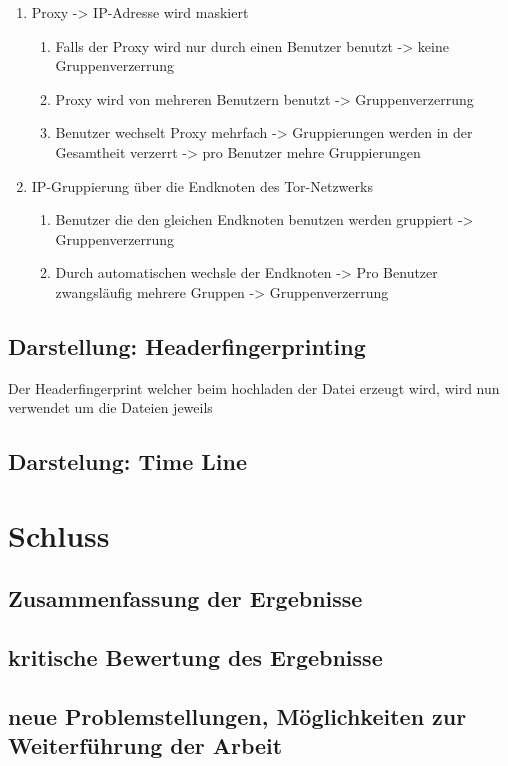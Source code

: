 \documentclass[
    fontsize=12pt,
    headings=small,
    parskip=half,           %
    bibliography=totoc,
    numbers=noenddot,       %
    open=any,               %
    ]{scrreprt}
\begin{document}
\begin{enumerate}
\item Proxy -> IP-Adresse wird maskiert
\begin{enumerate}
\item Falls der Proxy wird nur durch einen Benutzer benutzt -> keine Gruppenverzerrung 
\item Proxy wird von mehreren Benutzern benutzt -> Gruppenverzerrung 
\item Benutzer wechselt Proxy mehrfach -> Gruppierungen werden in der Gesamtheit verzerrt -> pro Benutzer mehre Gruppierungen 
\end{enumerate}
\item IP-Gruppierung über die Endknoten des Tor-Netzwerks 
\begin{enumerate}
\item Benutzer die den gleichen Endknoten benutzen werden gruppiert -> Gruppenverzerrung 
\item Durch automatischen wechsle der Endknoten -> Pro Benutzer zwangsläufig mehrere Gruppen -> Gruppenverzerrung 
\end{enumerate}
\end{enumerate}

\section{Darstellung: Headerfingerprinting}

Der Headerfingerprint welcher beim hochladen der Datei erzeugt wird, wird nun verwendet um die Dateien jeweils  

\section{Darstelung: Time Line}

\chapter{Schluss}

\section{Zusammenfassung der Ergebnisse}
\section{kritische Bewertung des Ergebnisse}
\section{neue Problemstellungen, Möglichkeiten zur Weiterführung der Arbeit}
\end{document}
